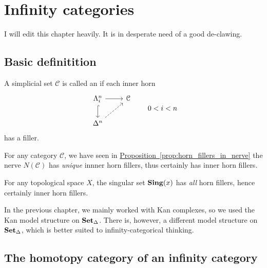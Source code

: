 \documentclass[main.tex]{subfiles}
\begin{document}
\newcommand{\ssmash}{\overset{\star}{\wedge}}

\chapter{Infinity categories}
\label{ch:infinity_categories}

I will edit this chapter heavily. It is in desperate need of a good de-clawing.

\section{Basic definitition}
\label{sec:basic_definitions_infinity_categories}

\begin{definition}
  \label{def:infinity_category}
  A simplicial set $\mathcal{C}$ is called an  if each inner horn
  \begin{equation*}
    \begin{tikzcd}
      \Lambda^{n}_{i}
      \arrow[r]
      \arrow[d, hookrightarrow]
      & \mathcal{C}
      \\
      \Delta^{n}
      \arrow[ur, dashed]
    \end{tikzcd}
    \qquad 0 < i < n
  \end{equation*}
  has a filler.
\end{definition}

\begin{example}
  \label{eg:nerve_of_category_is_infinity_category}
  For any category $\mathcal{C}$, we have seen in \hyperref[prop:horn_fillers_in_nerve]{Proposition~\ref*{prop:horn_fillers_in_nerve}} the nerve $N(\mathcal{C})$ has \emph{unique} innner horn fillers, thus certainly has inner horn fillers.
\end{example}

\begin{example}
  \label{eg:singular_set_of_topological_space_is_infinity_categeory}
  For any topological space $X$, the singular set $\mathbf{Sing}(x)$ has \emph{all} horn fillers, hence certainly inner horn fillers.
\end{example}

In the previous chapter, we mainly worked with Kan complexes, so we used the Kan model structure on $\operatorname{\mathbf{Set}_{\Delta}}$. There is, however, a different model structure on $\operatorname{\mathbf{Set}_{\Delta}}$, which is better suited to infinity-categorical thinking.

\section{The homotopy category of an infinity category}
\label{sec:the_homotopy_category_of_an_infinity_category}
\end{document}
